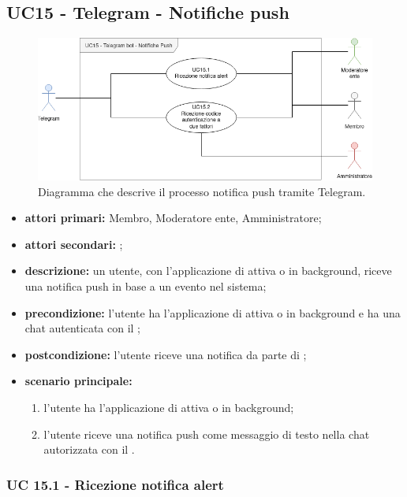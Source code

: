 \subsection{UC15 - Telegram - Notifiche push}

	\begin{figure}[H]
		\centering
		\includegraphics[scale=0.60]{res/images/uc15}
		\caption{Diagramma che descrive il processo notifica push tramite Telegram.}
	\end{figure}
		
	\begin{itemize}
		\item \textbf{attori primari:} Membro, Moderatore ente, Amministratore;
		\item \textbf{attori secondari:} ;
		\item \textbf{descrizione:} un utente, con l'applicazione di  attiva o in background, riceve una notifica push in base a un evento nel sistema; 
		\item \textbf{precondizione:} l'utente ha l'applicazione di  attiva o in background e ha una chat autenticata con il ;
		\item \textbf{postcondizione:} l'utente riceve una notifica da parte di ;
		\item \textbf{scenario principale:}
		\begin{enumerate}
			\item l'utente ha l'applicazione di  attiva o in background; 
			\item l'utente riceve una notifica push come messaggio di testo nella chat autorizzata con il .
		\end{enumerate}
	\end{itemize}
	
	\subsubsection{UC 15.1 - Ricezione notifica alert}

